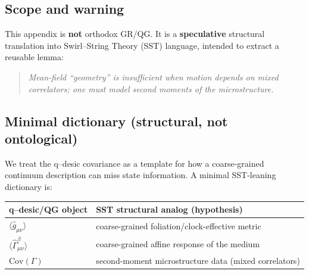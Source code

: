 \documentclass[11pt,a4paper]{article}
\theoremstyle{thmstyleone}
\theoremstyle{thmstyletwo}
\theoremstyle{thmstylethree}
\begin{document}
        \subsection*{Scope and warning}
            This appendix is \textbf{not} orthodox GR/QG. It is a \textbf{speculative} structural translation into Swirl--String Theory (SST)
            language, intended to extract a reusable lemma:
            \begin{quote}
                \emph{Mean-field ``geometry'' is insufficient when motion depends on mixed correlators; one must model second moments of the microstructure.}
            \end{quote}

        \subsection{Minimal dictionary (structural, not ontological)}
            We treat the q--desic covariance as a template for how a coarse-grained continuum description can miss state information.
            A minimal SST-leaning dictionary is:
            \begin{center}
                \begin{tabular}{@{}ll@{}}
                    \toprule
                    q--desic/QG object & SST structural analog (hypothesis) \\
                    \midrule
                    $\langle \hat g_{\mu\nu}\rangle$ & coarse-grained foliation/clock-effective metric \\
                    $\langle \hat\Gamma^\beta_{\mu\nu}\rangle$ & coarse-grained affine response of the medium \\
                    $\mathrm{Cov}(\Gamma)$ & second-moment microstructure data (mixed correlators) \\
                    \bottomrule
                \end{tabular}
            \end{center}
\end{document}
